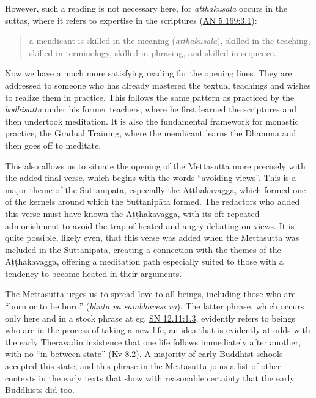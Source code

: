 \documentclass[12pt,openany]{book}%
\begin{document}
However, such a reading is not necessary here, for \textit{atthakusala} occurs in the suttas, where it refers to expertise in the scriptures (\href{https://suttacentral.net/an5.169/en/sujato\#3.1}{AN 5.169:3.1}):

\begin{quotation}%
a mendicant is skilled in the meaning (\textit{atthakusala}), skilled in the teaching, skilled in terminology, skilled in phrasing, and skilled in sequence.

%
\end{quotation}

Now we have a much more satisfying reading for the opening lines. They are addressed to someone who has already mastered the textual teachings and wishes to realize them in practice. This follows the same pattern as practiced by the \textit{bodhisatta} under his former teachers, where he first learned the scriptures and then undertook meditation. It is also the fundamental framework for monastic practice, the Gradual Training, where the mendicant learns the Dhamma and then goes off to meditate.

This also allows us to situate the opening of the Mettasutta more precisely with the added final verse, which begins with the words “avoiding views”. This is a major theme of the \textsanskrit{Suttanipāta}, especially the \textsanskrit{Aṭṭhakavagga}, which formed one of the kernels around which the \textsanskrit{Suttanipāta} formed. The redactors who added this verse must have known the \textsanskrit{Aṭṭhakavagga}, with its oft-repeated admonishment to avoid the trap of heated and angry debating on views. It is quite possible, likely even, that this verse was added when the Mettasutta was included in the \textsanskrit{Suttanipāta}, creating a connection with the themes of the \textsanskrit{Aṭṭhakavagga}, offering a meditation path especially suited to those with a tendency to become heated in their arguments.

The Mettasutta urges us to spread love to all beings, including those who are “born or to be born” (\textit{\textsanskrit{bhūtā} \textsanskrit{vā} \textsanskrit{sambhavesī} \textsanskrit{vā}}). The latter phrase, which occurs only here and in a stock phrase at eg. \href{https://suttacentral.net/sn12.11/en/sujato\#1.3}{SN 12.11:1.3}, evidently refers to beings who are in the process of taking a new life, an idea that is evidently at odds with the early Theravadin insistence that one life follows immediately after another, with no “in-between state” (\href{https://suttacentral.net/kv8.2}{Kv 8.2}). A majority of early Buddhist schools accepted this state, and this phrase in the Mettasutta joins a list of other contexts in the early texts that show with reasonable certainty that the early Buddhists did too.
\end{document}
